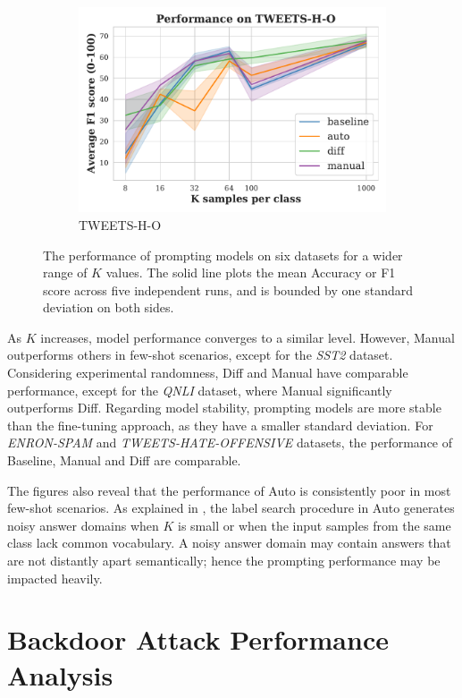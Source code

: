 \begin{figure}[!ht]
\begin{subfigure}{.33\textwidth}
  \includegraphics[width=\linewidth]{figures/evaluation_media/TWEETS-H-O_prompting_performance.pdf}
  \caption{TWEETS-H-O}
  \label{fig:tweets}
\end{subfigure}
\caption{The performance of prompting models on six datasets for a wider range of $K$ values. The solid line plots the mean Accuracy or F1 score across five independent runs, and is bounded by one standard deviation on both sides.}
\label{fig:more_k}
\end{figure}

As $K$ increases, model performance converges to a similar level. However, Manual outperforms others in few-shot scenarios, except for the \textit{SST2} dataset. Considering experimental randomness, Diff and Manual have comparable performance, except for the \textit{QNLI} dataset, where Manual significantly outperforms Diff. Regarding model stability, prompting models are more stable than the fine-tuning approach, as they have a smaller standard deviation. For \textit{ENRON-SPAM} and \textit{TWEETS-HATE-OFFENSIVE} datasets, the performance of Baseline, Manual and Diff are comparable. 

The figures also reveal that the performance of Auto is consistently poor in most few-shot scenarios. As explained in , the label search procedure in Auto generates noisy answer domains when $K$ is small or when the input samples from the same class lack common vocabulary. A noisy answer domain may contain answers that are not distantly apart semantically; hence the prompting performance may be impacted heavily.

\section{Backdoor Attack Performance Analysis} \label{sec:eval-backdoor}
